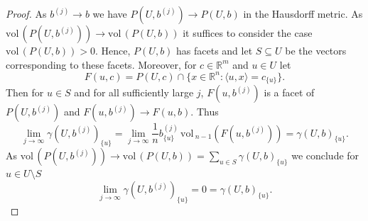 \documentclass[10pt,a4paper]{amsart}
\newcommand{\R}{\mathbb{R}}
\newcommand{\vol}{\mathrm{vol}\,}
\begin{document}
\begin{proof} As $b^{(j)}\to b$  we have $P(U,b^{(j)})\to P(U,b)$ in
  the Hausdorff metric. As $\vol(P(U,b^{(j)}))\to \vol(P(U,b))$ it
  suffices to consider the case $\vol(P(U,b))>0$. Hence, $P(U,b)$ has facets and let $S\subseteq
  U$ be the vectors corresponding to these facets. Moreover, for
  $c\in\R^m$ and $u\in U$ let
  \begin{equation*}
     F(u,c)= P(U,c)\cap\{x\in\R^n : \langle u,x\rangle =c_{\{u\}}\}.
  \end{equation*}
  Then for $u\in S$  and 
 for all sufficiently large $j$, $F(u,b^{(j)})$ is a facet of
 $P(U,b^{(j)})$ and  $F(u,b^{(j)})\to F(u,b)$. Thus 
\begin{equation*}
            \lim_{j\to\infty}  \gamma(U, b^{(j)})_{\{u\}}=  \lim_{j\to\infty} \frac{1}{n} b^{(j)}_{\{u\}}\,\vol_{n-1}(F(u,b^{(j)}))=\gamma(U,b)_{\{u\}}.
\end{equation*}
As $\vol(P(U, b^{(j)})) \to\vol(P(U,b))=\sum_{u\in S} \gamma(U,b)_{\{u\}}$ we conclude for $u\in U\setminus S$
\begin{equation*}
            \lim_{j\to\infty}  \gamma(U, b^{(j)})_{\{u\}}= 0=\gamma(U,b)_{\{u\}}.
\end{equation*}
\end{proof}
\end{document}
